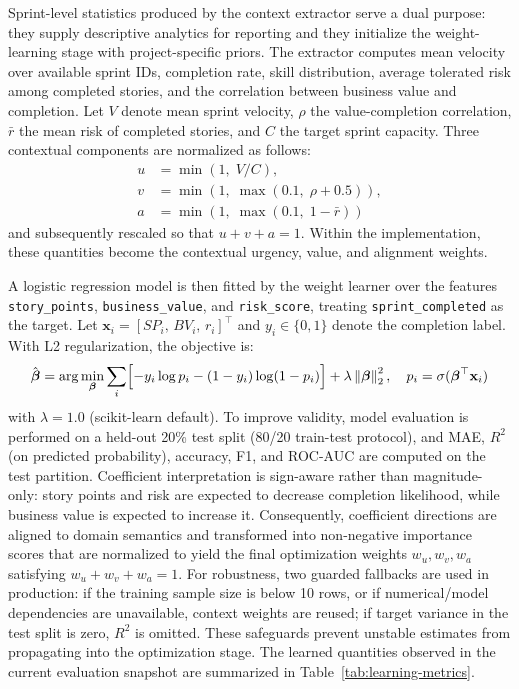 \documentclass[conference]{IEEEtran}
\begin{document}
Sprint-level statistics produced by the context extractor serve a dual purpose:
they supply descriptive analytics for reporting and they initialize the
weight-learning stage with project-specific priors.
The extractor computes mean velocity over available sprint IDs, completion rate,
skill distribution, average tolerated risk among completed stories, and the
correlation between business value and completion.
Let $V$ denote mean sprint velocity, $\rho$ the value-completion correlation, $\bar{r}$
the mean risk of completed stories, and $C$ the target sprint capacity.
Three contextual components are normalized as follows:
\begin{equation}
	\begin{aligned}
		u & = \min(1,\; V/C),                     \\
		v & = \min(1,\; \max(0.1,\; \rho + 0.5)), \\
		a & = \min(1,\; \max(0.1,\; 1 - \bar{r}))
	\end{aligned}
	\label{eq:context}
\end{equation}
and subsequently rescaled so that $u+v+a=1$.
Within the implementation, these quantities become the contextual urgency, value,
and alignment weights.

A logistic regression model is then fitted by the weight learner over the features
\texttt{story\_points}, \texttt{business\_value}, and \texttt{risk\_score}, treating
\texttt{sprint\_completed} as the target.
Let $\mathbf{x}_i = [SP_i,\, BV_i,\, r_i]^\top$ and $y_i \in \{0,1\}$ denote
the completion label.
With L2 regularization, the objective is:
\begin{equation}
	\hat{\boldsymbol{\beta}} = \arg\min_{\boldsymbol{\beta}}
	\sum_i \Bigl[ -y_i\log p_i - (1-y_i)\log(1-p_i) \Bigr]
	+ \lambda \left\| \boldsymbol{\beta} \right\|_2^2,
	\quad p_i = \sigma(\boldsymbol{\beta}^\top\mathbf{x}_i)
	\label{eq:logistic}
\end{equation}
with $\lambda = 1.0$ (scikit-learn default).
To improve validity, model evaluation is performed on a held-out 20\% test split
(80/20 train-test protocol), and MAE, $R^2$ (on predicted probability), accuracy,
F1, and ROC-AUC are computed on the test partition.
Coefficient interpretation is sign-aware rather than magnitude-only: story points
and risk are expected to decrease completion likelihood, while business value is
expected to increase it. Consequently, coefficient directions are aligned to domain
semantics and transformed into non-negative importance scores that are normalized to
yield the final optimization weights $w_u, w_v, w_a$ satisfying
$w_u + w_v + w_a = 1$.
For robustness, two guarded fallbacks are used in production: if the training sample
size is below 10 rows, or if numerical/model dependencies are unavailable, context
weights are reused; if target variance in the test split is zero, $R^2$ is omitted.
These safeguards prevent unstable estimates from propagating into the optimization
stage.
The learned quantities observed in the current evaluation snapshot are summarized in
Table~\ref{tab:learning-metrics}.
\end{document}
